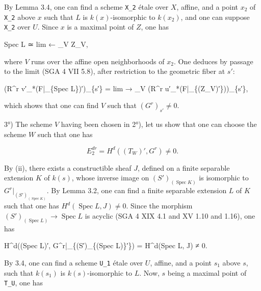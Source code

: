 \documentclass[
]{article}
\newenvironment{Shaded}{}{}
\newcommand{\NormalTok}[1]{#1}
\begin{document}
By Lemma 3.4, one can find a scheme \texttt{X\_2} étale over \(X\),
affine, and a point \(x_{2}\) of \texttt{X\_2} above \(x\) such that
\(L\) is \(k(x)\)-isomorphic to \(k(x_{2})\), and one can suppose
\texttt{X\_2} over \(U\). Since \(x\) is a maximal point of \(Z\), one
has

\begin{Shaded}
\begin{Highlighting}[]
\NormalTok{Spec L ≃ lim ← \_V Z\_V,}
\end{Highlighting}
\end{Shaded}

where \(V\) runs over the affine open neighborhoods of \(x_{2}\). One
deduces by passage to the limit (SGA 4 VII 5.8), after restriction to
the geometric fiber at \(s'\):

\begin{Shaded}
\begin{Highlighting}[]
\NormalTok{(R\^{}r v′\_*(F|\_\{Spec L\})′)\_\{s′\} = lim → \_V (R\^{}r u′\_*(F|\_\{(Z\_V)′\}))\_\{s′\},}
\end{Highlighting}
\end{Shaded}

which shows that one can find \(V\) such that \((G^{r})_{s'} \neq 0\).

3°) The scheme \(V\) having been chosen in 2°), let us show that one can
choose the scheme \(W\) such that one has

\[
E^{dr}_{2} = H^{d}((T_{W})', G^{r}) \neq 0.
\]

By (ii), there exists a constructible sheaf \(J\), defined on a finite
separable extension \(K\) of \(k(s)\), whose inverse image on
\((S')_{(\operatorname{Spec} K)}\) is isomorphic to
\(G^{r}|_{(S')_{(\operatorname{Spec} K)}}\). By Lemma 3.2, one can find
a finite separable extension \(L\) of \(K\) such that one has
\(H^{d}(\operatorname{Spec} L, J) \neq 0\). Since the morphism
\((S')_{(\operatorname{Spec} L)} \to \operatorname{Spec} L\) is acyclic
(SGA 4 XIX 4.1 and XV 1.10 and 1.16), one has

\begin{Shaded}
\begin{Highlighting}[]
\NormalTok{H\^{}d((Spec L)′, G\^{}r|\_\{(S′)\_\{(Spec L)\}′\}) = H\^{}d(Spec L, J) ≠ 0.}
\end{Highlighting}
\end{Shaded}

By 3.4, one can find a scheme \texttt{U\_1} étale over \(U\), affine,
and a point \(s_{1}\) above \(s\), such that \(k(s_{1})\) is
\(k(s)\)-isomorphic to \(L\). Now, \(s\) being a maximal point of
\texttt{T\_U}, one has
\end{document}
